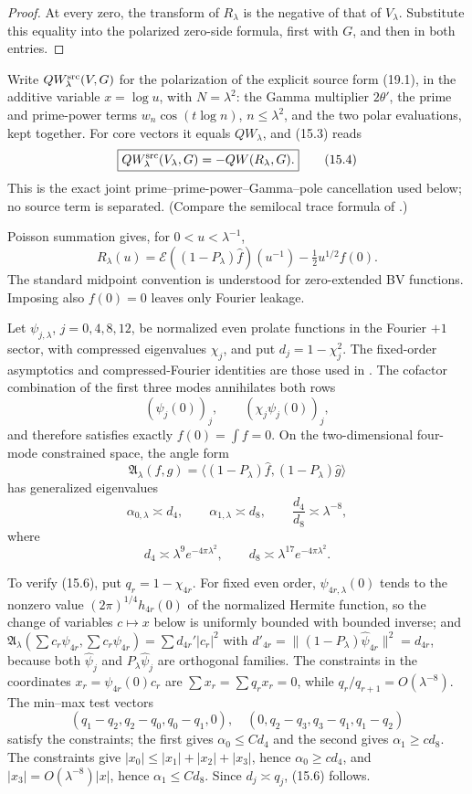 \documentclass[11pt]{amsart}
\theoremstyle{definition}
\theoremstyle{remark}
\begin{document}
\begin{proof}
At every zero, the transform of \(R_\lambda\) is the negative of that of
\(V_\lambda\).  Substitute this equality into the polarized zero-side
formula, first with \(G\), and then in both entries.
\end{proof}

Write \(QW_\lambda^{\rm src}(V,G)\) for the polarization of the explicit
source form (19.1), in the additive variable \(x=\log u\), with \(N=\lambda^2\):
the Gamma multiplier \(2\theta'\), the prime and prime-power terms
\(w_n\cos(t\log n)\), \(n\le\lambda^2\), and the two polar evaluations,
kept together.  For core vectors it equals \(QW_\lambda\), and
(15.3) reads
\[
\boxed{
 QW_\lambda^{\rm src}(V_\lambda,G)
 =-QW(R_\lambda,G).}
\tag{15.4}
\]
This is the exact joint prime--prime-power--Gamma--pole cancellation used
below; no source term is separated.  (Compare the semilocal trace formula of
\cite{Connes2026}.)

Poisson summation gives, for \(0<u<\lambda^{-1}\),
\[
 R_\lambda(u)
 =\mathcal E((1-P_\lambda)\widehat f)(u^{-1})
 -\tfrac12u^{1/2}f(0).
 \tag{15.5}
\]
The standard midpoint convention is understood for zero-extended BV
functions.  Imposing also \(f(0)=0\) leaves only Fourier leakage.

Let \(\psi_{j,\lambda}\), \(j=0,4,8,12\), be normalized even prolate
functions in the Fourier \(+1\) sector, with compressed eigenvalues
\(\chi_j\), and put \(d_j=1-\chi_j^2\).  The fixed-order asymptotics and
compressed-Fourier identities are those used in \cite{CCM}.  The cofactor
combination of the
first three modes annihilates both rows
\[
 (\psi_j(0))_j,
 \qquad (\chi_j\psi_j(0))_j,
\]
and therefore satisfies exactly \(f(0)=\int f=0\).  On the two-dimensional
four-mode constrained space, the angle form
\[
 \mathfrak A_\lambda(f,g)
 =\langle(1-P_\lambda)\widehat f,
          (1-P_\lambda)\widehat g\rangle
\]
has generalized eigenvalues
\[
 \boxed{
 \alpha_{0,\lambda}\asymp d_4,
 \qquad
 \alpha_{1,\lambda}\asymp d_8,
 \qquad
 \frac{d_4}{d_8}\asymp\lambda^{-8},}
 \tag{15.6}
\]
where
\[
 d_4\asymp\lambda^9e^{-4\pi\lambda^2},
 \qquad d_8\asymp\lambda^{17}e^{-4\pi\lambda^2}.
 \tag{15.7}
\]

To verify (15.6), put \(q_r=1-\chi_{4r}\).  For fixed even order,
\(\psi_{4r,\lambda}(0)\) tends to the nonzero value \((2\pi)^{1/4}h_{4r}(0)\)
of the normalized Hermite function, so
the change of variables \(c\mapsto x\) below is uniformly bounded with
bounded inverse; and
\(\mathfrak A_\lambda(\sum c_r\psi_{4r},\sum c_r\psi_{4r})
=\sum d_{4r}'|c_r|^2\) with \(d'_{4r}=\|(1-P_\lambda)\widehat\psi_{4r}\|^2
=d_{4r}\), because both \(\widehat\psi_j\) and
\(P_\lambda\widehat\psi_j\) are orthogonal families.  The constraints in the
coordinates \(x_r=\psi_{4r}(0)c_r\) are
\(\sum x_r=\sum q_rx_r=0\), while
\(q_r/q_{r+1}=O(\lambda^{-8})\).  The min--max test vectors
\[
 (q_1-q_2,q_2-q_0,q_0-q_1,0),
 \quad
 (0,q_2-q_3,q_3-q_1,q_1-q_2)
\]
satisfy the constraints; the first gives \(\alpha_0\le Cd_4\) and the second
gives \(\alpha_1\ge cd_8\).  The constraints give
\(|x_0|\le|x_1|+|x_2|+|x_3|\), hence \(\alpha_0\ge cd_4\), and
\(|x_3|=O(\lambda^{-8})|x|\), hence \(\alpha_1\le Cd_8\).  Since \(d_j\asymp q_j\), (15.6) follows.
\end{document}
